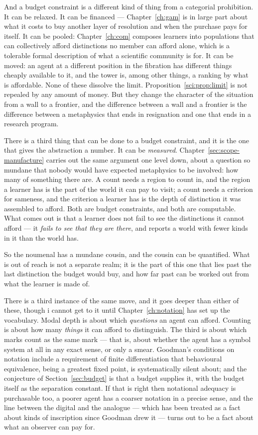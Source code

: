And a budget constraint is a different kind of thing from a
categorial prohibition.
It can be relaxed.
It can be financed --- Chapter~\ref{ch:gam} is in large part about
what it costs to buy another layer of resolution and when the
purchase pays for itself.
It can be pooled: Chapter~\ref{ch:com} composes learners into
populations that can collectively afford distinctions no member can
afford alone, which is a tolerable formal description of what a
scientific community is for.
It can be moved: an agent at a different position in the fibration
has different things cheaply available to it, and the tower is,
among other things, a ranking by what is affordable.
None of these dissolve the limit.
Proposition~\ref{sci:prop:limit} is not repealed by any amount of
money.
But they change the character of the situation from a wall to a
frontier, and the difference between a wall and a frontier is the
difference between a metaphysics that ends in resignation and one
that ends in a research program.

There is a third thing that can be done to a budget constraint, and
it is the one that gives the abstraction a number.
It can be \emph{measured}.
Chapter~\ref{sec:scope-manufacture} carries out the same argument
one level down, about a question so mundane that nobody would have
expected metaphysics to be involved: how many of something there
are.
A count needs a region to count in, and the region a learner has is
the part of the world it can pay to visit; a count needs a criterion
for sameness, and the criterion a learner has is the depth of
distinction it was assembled to afford.
Both are budget constraints, and both are computable.
What comes out is that a learner does not fail to see the
distinctions it cannot afford --- it \emph{fails to see that they
are there}, and reports a world with fewer kinds in it than the
world has.

So the noumenal has a mundane cousin, and the cousin can be
quantified. What is out of reach is not a separate realm; it is the
part of this one that lies past the last distinction the budget
would buy, and how far past can be worked out from what the learner
is made of.

There is a third instance of the same move, and it goes deeper than
either of these, though i cannot get to it until
Chapter~\ref{ch:notation} has set up the vocabulary.
Modal depth is about which \emph{questions} an agent can afford.
Counting is about how many \emph{things} it can afford to
distinguish.
The third is about which marks count as the same mark --- that is,
about whether the agent has a symbol system at all in any exact
sense, or only a smear.
Goodman's conditions on notation include a requirement of finite
differentiation that behavioural equivalence, being a greatest
fixed point, is systematically silent about; and the conjecture of
Section~\ref{sec:budget} is that a budget supplies it, with the
budget itself as the separation constant.
If that is right then notational adequacy is purchasable too, a
poorer agent has a coarser notation in a precise sense, and the
line between the digital and the analogue --- which has been
treated as a fact about kinds of inscription since Goodman drew it
--- turns out to be a fact about what an observer can pay for.

